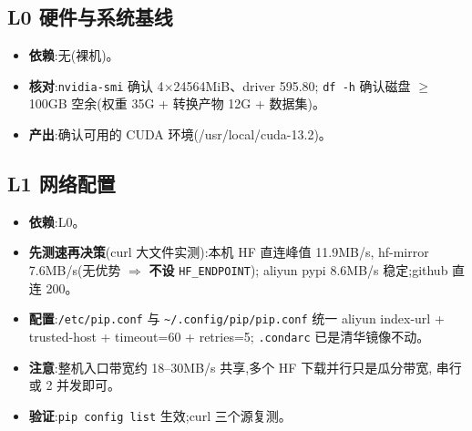 \documentclass[11pt]{ctexart}
\begin{document}
\subsection{L0 硬件与系统基线}
\begin{itemize}
\item \textbf{依赖}:无(裸机)。
\item \textbf{核对}:\texttt{nvidia-smi} 确认 4$\times$24564MiB、driver 595.80;
\texttt{df -h} 确认磁盘 $\ge$100GB 空余(权重 35G + 转换产物 12G + 数据集)。
\item \textbf{产出}:确认可用的 CUDA 环境(/usr/local/cuda-13.2)。
\end{itemize}

\subsection{L1 网络配置}
\begin{itemize}
\item \textbf{依赖}:L0。
\item \textbf{先测速再决策}(curl 大文件实测):本机 HF 直连峰值 11.9MB/s,
hf-mirror 7.6MB/s(无优势 $\Rightarrow$ \textbf{不设} \texttt{HF\_ENDPOINT});
aliyun pypi 8.6MB/s 稳定;github 直连 200。
\item \textbf{配置}:\texttt{/etc/pip.conf} 与 \texttt{\textasciitilde/.config/pip/pip.conf}
统一 aliyun index-url + trusted-host + timeout=60 + retries=5;
\texttt{.condarc} 已是清华镜像不动。
\item \textbf{注意}:整机入口带宽约 18--30MB/s 共享,多个 HF 下载并行只是瓜分带宽,
串行或 2 并发即可。
\item \textbf{验证}:\texttt{pip config list} 生效;curl 三个源复测。
\end{itemize}
\end{document}
